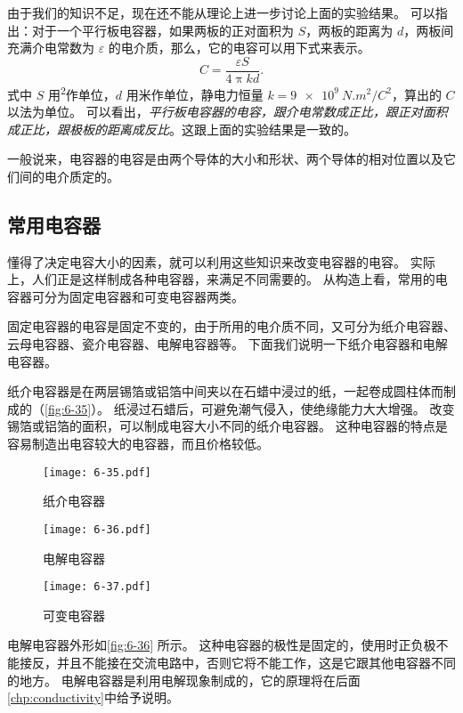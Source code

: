 由于我们的知识不足，现在还不能从理论上进一步讨论上面的实验结果。
可以指出：对于一个平行板电容器，如果两板的正对面积为 $S$，两板的距离为 $d$，两板间充满介电常数为 $\varepsilon$ 的电介质，那么，它的电容可以用下式来表示。
\[C=\frac{\varepsilon S}{4\uppi kd}.\]
式中 $S$ 用\unit{^2}作单位，$d$ 用米作单位，静电力恒量 $k=\qty{9e9}{ N.m^2/C^2}$，算出的 $C$ 以法为单位。
可以看出，\emph{平行板电容器的电容，跟介电常数成正比，跟正对面积成正比，跟极板的距离成反比}。这跟上面的实验结果是一致的。

一般说来，电容器的电容是由两个导体的大小和形状、两个导体的相对位置以及它们间的电介质定的。

\subsection{常用电容器}

懂得了决定电容大小的因素，就可以利用这些知识来改变电容器的电容。
实际上，人们正是这样制成各种电容器，来满足不同需要的。
从构造上看，常用的电容器可分为固定电容器和可变电容器两类。

固定电容器的电容是固定不变的，由于所用的电介质不同，又可分为纸介电容器、云母电容器、瓷介电容器、电解电容器等。
下面我们说明一下纸介电容器和电解电容器。

纸介电容器是在两层锡箔或铝箔中间夹以在石蜡中浸过的纸，一起卷成圆柱体而制成的（\cref{fig:6-35}）。
纸浸过石蜡后，可避免潮气侵入，使绝缘能力大大增强。
改变锡箔或铝箔的面积，可以制成电容大小不同的纸介电容器。
这种电容器的特点是容易制造出电容较大的电容器，而且价格较低。
\begin{figure}
	\begin{minipage}[b]{0.35\linewidth}\centering
		\texttt{[image: 6-35.pdf]}
		\caption{纸介电容器}\label{fig:6-35}
	\end{minipage}
	\begin{minipage}[b]{0.30\linewidth}\centering
		\texttt{[image: 6-36.pdf]}
		\caption{电解电容器}\label{fig:6-36}
	\end{minipage}
	\begin{minipage}[b]{0.33\linewidth}\centering
		\texttt{[image: 6-37.pdf]}
		\caption{可变电容器}\label{fig:6-37}
	\end{minipage}
\end{figure}

电解电容器外形如\cref{fig:6-36} 所示。
这种电容器的极性是固定的，使用时正负极不能接反，并且不能接在交流电路中，否则它将不能工作，这是它跟其他电容器不同的地方。
电解电容器是利用电解现象制成的，它的原理将在后面\cref{chp:conductivity}中给予说明。

